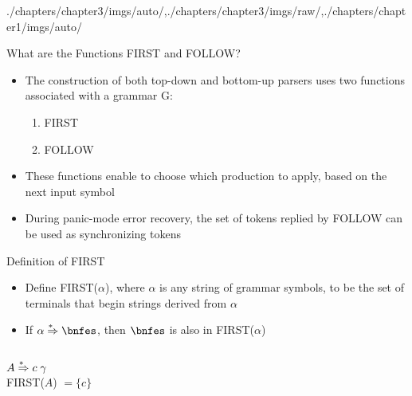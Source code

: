 \begin{graphicspathcontext}{{./chapters/chapter3/imgs/auto/},{./chapters/chapter3/imgs/raw/},{./chapters/chapter1/imgs/auto/}}
\begin{bibunit}[apalike]
\begin{frame}[background=6]{{What are the Functions} FIRST and FOLLOW?}
	\begin{itemize}
	\item The construction of both top-down and bottom-up parsers uses two functions associated with a grammar G:
		\begin{enumerate}
		\item FIRST
		\item FOLLOW
		\end{enumerate}
	\vfill
	\item These functions enable to choose which production to apply, based on the next input symbol
	\vfill
	\item During panic-mode error recovery, the set of tokens replied by FOLLOW can be used as synchronizing tokens
	\end{itemize}
\end{frame}

\begin{frame}{Definition of FIRST}
	\begin{itemize}
	\item Define FIRST($\alpha$), where $\alpha$ is any string of grammar symbols, to be the set of terminals that begin strings derived from $\alpha$
	\item If $\alpha \seqderiv \bnfes$, then $\bnfes$ is also in FIRST($\alpha$)
	\end{itemize}
	\vfill
	\begin{example}
		\begin{columns}
			\begin{column}[t]{.4\linewidth}
				$A \overset{*\hspace{.4em}}{\Rightarrow} c \; \gamma$ \\
				FIRST($A$) $ = \{ c \}$
			\end{column}
			\begin{column}[t]{.4\linewidth}
			\end{column}
		\end{columns}
	\end{example}
\end{frame}


\end{bibunit}
\end{graphicspathcontext}
